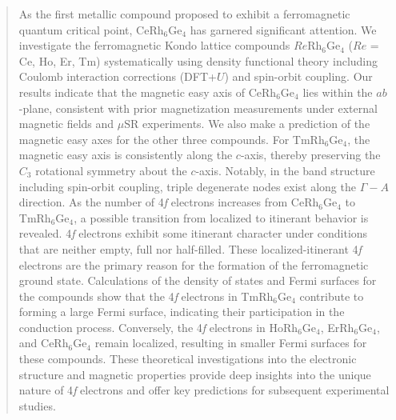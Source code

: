 \documentclass[preprint,12pt]{elsarticle}
\begin{document}
\begin{abstract}
		As the first metallic compound proposed to exhibit a ferromagnetic quantum critical point, CeRh$_6$Ge$_4$ has garnered significant attention. We investigate the ferromagnetic Kondo lattice compounds $Re$Rh$_6$Ge$_4$ ($Re$ = Ce, Ho, Er, Tm) systematically using density functional theory including Coulomb interaction corrections (DFT+$U$) and spin-orbit coupling. Our results indicate that the magnetic easy axis of CeRh$_6$Ge$_4$ lies within the $ab$-plane, consistent with prior magnetization measurements under external magnetic fields and $\mu\mathrm{SR}$ experiments. We also make a prediction of the magnetic easy axes for the other three compounds. For TmRh$_6$Ge$_4$, the magnetic easy axis is consistently along the $c$-axis, thereby preserving the $C_3$ rotational symmetry about the $c$-axis. Notably, in the band structure including spin-orbit coupling, triple degenerate nodes exist along the $\Gamma-A$ direction. As the number of 4\textit{f} electrons increases from CeRh$_6$Ge$_4$ to TmRh$_6$Ge$_4$, a possible transition from localized to itinerant behavior is revealed. 4\textit{f} electrons exhibit some itinerant character under conditions that are neither empty, full nor half-filled. These localized-itinerant 4\textit{f} electrons are the primary reason for the formation of the ferromagnetic ground state. Calculations of the density of states and Fermi surfaces for the compounds show that the 4\textit{f} electrons in TmRh$_6$Ge$_4$ contribute to forming a large Fermi surface, indicating their participation in the conduction process. Conversely, the 4\textit{f} electrons in HoRh$_6$Ge$_4$, ErRh$_6$Ge$_4$, and CeRh$_6$Ge$_4$ remain localized, resulting in smaller Fermi surfaces for these compounds. These theoretical investigations into the electronic structure and magnetic properties provide deep insights into the unique nature of 4\textit{f} electrons and offer key predictions for subsequent experimental studies.
	\end{abstract}
	
\end{document}
